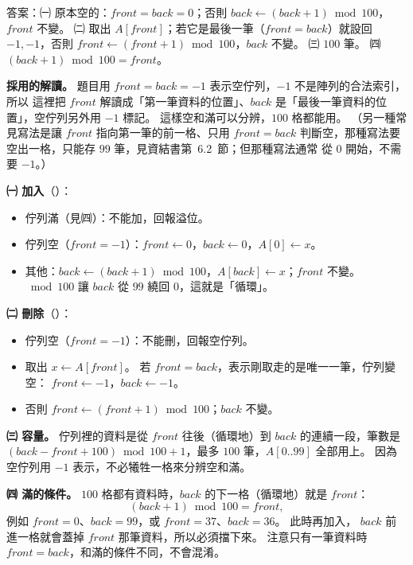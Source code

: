 \begin{pastsoln}
答案：㈠ 原本空的：$\mathit{front} = \mathit{back} = 0$；否則 $\mathit{back} \gets (\mathit{back} + 1) \bmod 100$，
$\mathit{front}$ 不變。 ㈡ 取出 $A[\mathit{front}]$；若它是最後一筆（$\mathit{front} = \mathit{back}$）就設回
$-1, -1$，否則 $\mathit{front} \gets (\mathit{front} + 1) \bmod 100$，$\mathit{back}$ 不變。 ㈢ $100$ 筆。
㈣ $(\mathit{back} + 1) \bmod 100 = \mathit{front}$。

\textbf{採用的解讀。} 題目用 $\mathit{front} = \mathit{back} = -1$ 表示空佇列，$-1$ 不是陣列的合法索引，所以
這裡把 $\mathit{front}$ 解讀成「第一筆資料的位置」、$\mathit{back}$ 是「最後一筆資料的位置」，空佇列另外用 $-1$
標記。 這樣空和滿可以分辨，$100$ 格都能用。 （另一種常見寫法是讓 $\mathit{front}$ 指向第一筆的前一格、只用
$\mathit{front} = \mathit{back}$ 判斷空，那種寫法要空出一格，只能存 $99$ 筆，見資結書第~6.2~節；但那種寫法通常
從 $0$ 開始，不需要 $-1$。）

\textbf{㈠ 加入}（）：
\begin{itemize}
\item 佇列滿（見㈣）：不能加，回報溢位。
\item 佇列空（$\mathit{front} = -1$）：$\mathit{front} \gets 0$，$\mathit{back} \gets 0$，$A[0] \gets x$。
\item 其他：$\mathit{back} \gets (\mathit{back} + 1) \bmod 100$，$A[\mathit{back}] \gets x$；$\mathit{front}$ 不變。
$\bmod 100$ 讓 $\mathit{back}$ 從 $99$ 繞回 $0$，這就是「循環」。
\end{itemize}

\textbf{㈡ 刪除}（）：
\begin{itemize}
\item 佇列空（$\mathit{front} = -1$）：不能刪，回報空佇列。
\item 取出 $x \gets A[\mathit{front}]$。 若 $\mathit{front} = \mathit{back}$，表示剛取走的是唯一一筆，佇列變空：
$\mathit{front} \gets -1$，$\mathit{back} \gets -1$。
\item 否則 $\mathit{front} \gets (\mathit{front} + 1) \bmod 100$；$\mathit{back}$ 不變。
\end{itemize}

\textbf{㈢ 容量。} 佇列裡的資料是從 $\mathit{front}$ 往後（循環地）到 $\mathit{back}$ 的連續一段，筆數是
$(\mathit{back} - \mathit{front} + 100) \bmod 100 + 1$，最多 $100$ 筆，$A[0..99]$ 全部用上。 因為空佇列用
$-1$ 表示，不必犧牲一格來分辨空和滿。

\textbf{㈣ 滿的條件。} $100$ 格都有資料時，$\mathit{back}$ 的下一格（循環地）就是 $\mathit{front}$：
\[
(\mathit{back} + 1) \bmod 100 = \mathit{front},
\]
例如 $\mathit{front} = 0$、$\mathit{back} = 99$，或 $\mathit{front} = 37$、$\mathit{back} = 36$。 此時再加入，
$\mathit{back}$ 前進一格就會蓋掉 $\mathit{front}$ 那筆資料，所以必須擋下來。 注意只有一筆資料時
$\mathit{front} = \mathit{back}$，和滿的條件不同，不會混淆。
\end{pastsoln}
